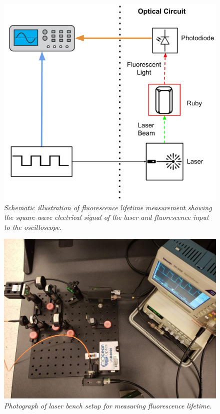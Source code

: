 \documentclass[11pt, a4paper, twocolumn]{article}
\begin{document}
\begin{figure}[H]
\includegraphics[width=\linewidth]{decayMeasurementSchematic.png}
\caption{\textit{Schematic illustration of fluorescence lifetime measurement showing the square-wave electrical signal of the laser and fluorescence input to the oscilloscope.}}
\label{fig:decayMeasurementSchematic}
\end{figure}

\begin{figure} %
\includegraphics[width=\linewidth, height=\linewidth]{laserBenchPhoto.png}
\caption{\textit{Photograph of laser bench setup for measuring fluorescence lifetime.
}}
\label{fig:laserBenchPhoto}
\end{figure}
\end{document}
